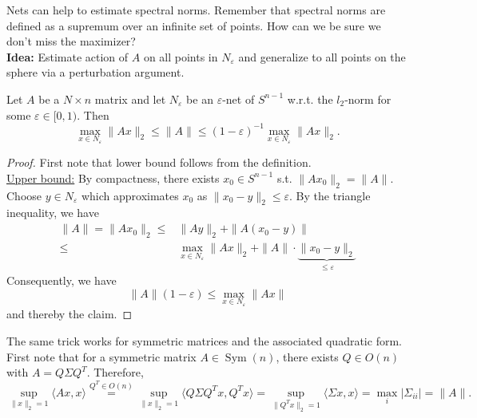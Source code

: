 Nets can help to estimate spectral norms. Remember that spectral norms are defined as a supremum over an infinite set of points. How can we be sure we don't miss the maximizer?\\
 \textbf{Idea:} Estimate action of $A$ on all points in $N_\varepsilon$ and generalize to all points on the sphere via a perturbation argument.
\begin{lemma}
\begin{mdframed}
Let $A$ be a $N\times n$ matrix and let $N_\varepsilon$ be an $\varepsilon$-net of $S^{n-1}$ w.r.t. the $l_2$-norm for some $\varepsilon \in [0,1)$. Then
$$\max_{x\in N_\varepsilon} \|Ax\|_2 \leq \|A\| \leq (1-\varepsilon)^{-1} \max_{x\in N_\varepsilon} \|Ax\|_2.$$
\end{mdframed}
\begin{proof}
First note that lower bound follows from the definition. \\
\underline{Upper bound:} By compactness, there exists $x_0 \in S^{n-1}$ s.t. $\|Ax_0\|_2 = \|A\|$. Choose $y\in N_\varepsilon$ which approximates $x_0$ as $\|x_0-y\|_2 \leq \varepsilon$. By the triangle inequality, we have
\begin{equation*}
\begin{split}
\|A\|= \|Ax_0\|_2 \leq & \|Ay\|_2 + \|A(x_0-y)\| 	\\
\leq  & \max_{x\in N_\varepsilon} \|Ax\|_2 + \|A\| \cdot \underbrace{\|x_0-y\|_2}_{\leq \varepsilon}
\end{split}
\end{equation*}
Consequently, we have
\begin{equation*}
\|A\|(1-\varepsilon) \leq \max_{x\in N_\varepsilon} \|Ax\|
\end{equation*}
and thereby the claim.
\end{proof}
\end{lemma}
The same trick works for symmetric matrices and the associated quadratic form. First note that for a symmetric matrix $A\in \operatorname{Sym}(n)$, there exists $Q \in O(n)$ with $A= Q\Sigma Q^T$. Therefore,
$$
\sup_{\|x\|_2 =1} \langle Ax, x\rangle \overset{Q^T \in O(n)}= %
\sup_{\|x\|_2=1} \langle Q\Sigma Q^Tx, Q^T x\rangle = \sup_{\|Q^Tx\|_2=1} \langle \Sigma x, x\rangle = \max_{i} |\Sigma_{ii}| = \|A\|.
$$
